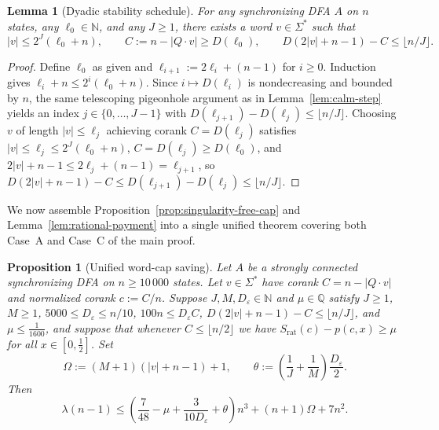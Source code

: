 \documentclass[11pt]{article}
\newtheorem{proposition}[theorem]{Proposition}
\newtheorem{lemma}[theorem]{Lemma}
\theoremstyle{definition}
\theoremstyle{remark}
\newcommand{\Q}{\mathbb{Q}}
\newcommand{\N}{\mathbb{N}}
\begin{document}
\begin{lemma}[Dyadic stability schedule]\label{lem:dyadic-schedule}
For any synchronizing DFA $A$ on $n$ states, any $\ell_0 \in \N$, and any $J \ge 1$, there exists a word $v \in \Sigma^*$ such that
\[
  |v| \le 2^J (\ell_0 + n), \qquad
  C := n - |Q \cdot v| \ge D(\ell_0), \qquad
  D(2|v| + n - 1) - C \le \lfloor n / J \rfloor.
\]
\end{lemma}

\begin{proof}
Define $\ell_0$ as given and $\ell_{i+1} := 2 \ell_i + (n - 1)$ for $i \ge 0$. Induction gives $\ell_i + n \le 2^i (\ell_0 + n)$. Since $i \mapsto D(\ell_i)$ is nondecreasing and bounded by $n$, the same telescoping pigeonhole argument as in Lemma~\ref{lem:calm-step} yields an index $j \in \{0, \dots, J - 1\}$ with $D(\ell_{j+1}) - D(\ell_j) \le \lfloor n / J \rfloor$. Choosing $v$ of length $|v| \le \ell_j$ achieving corank $C = D(\ell_j)$ satisfies $|v| \le \ell_j \le 2^J (\ell_0 + n)$, $C = D(\ell_j) \ge D(\ell_0)$, and $2|v| + n - 1 \le 2 \ell_j + (n - 1) = \ell_{j+1}$, so $D(2|v| + n - 1) - C \le D(\ell_{j+1}) - D(\ell_j) \le \lfloor n / J \rfloor$.
\end{proof}

We now assemble Proposition~\ref{prop:singularity-free-cap} and Lemma~\ref{lem:rational-payment} into a single unified theorem covering both Case~A and Case~C of the main proof.

\begin{proposition}[Unified word-cap saving]\label{prop:word-cap}
Let $A$ be a strongly connected synchronizing DFA on $n \ge 10\,000$ states. Let $v \in \Sigma^*$ have corank $C = n - |Q \cdot v|$ and normalized corank $c := C / n$. Suppose $J, M, D_\varepsilon \in \N$ and $\mu \in \Q$ satisfy $J \ge 1$, $M \ge 1$, $5000 \le D_\varepsilon \le n / 10$, $100 n \le D_\varepsilon C$, $D(2|v| + n - 1) - C \le \lfloor n / J \rfloor$, and $\mu \le \frac{1}{1600}$, and suppose that whenever $C \le \lfloor n/2 \rfloor$ we have $S_{\mathrm{rat}}(c) - p(c, x) \ge \mu$ for all $x \in [0, \frac{1}{2}]$. Set
\[
  \Omega := (M + 1)(|v| + n - 1) + 1, \qquad
  \theta := \left(\frac{1}{J} + \frac{1}{M}\right)\frac{D_\varepsilon}{2}.
\]
Then
\begin{equation}\label{eq:word-cap}
  \lambda(n - 1) \le \left(\frac{7}{48} - \mu + \frac{3}{10 D_\varepsilon} + \theta\right) n^3
    + (n + 1)\Omega + 7 n^2.
\end{equation}
\end{proposition}
\end{document}
